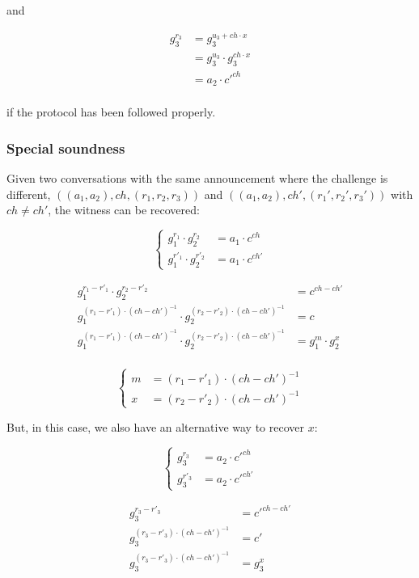 \documentclass{article}
\begin{document}
and 

\begin{align*}
  g_3^{r_3}
    &= g_3^{u_3 + ch \cdot x} \\
    &= g_3^{u_3} \cdot g_3^{ch \cdot x} \\
    &= a_2 \cdot c'^{ch} \\
\end{align*}

if the protocol has been followed properly.

\subsubsection{Special soundness}

Given two conversations with the same announcement where the
challenge is different,
$((a_1, a_2), ch, (r_1, r_2, r_3))$ and $((a_1, a_2), ch', (r_1', r_2', r_3'))$ 
with $ch \neq ch'$, the witness can be recovered:

$$
\begin{cases}
  g_1^{r_1} \cdot g_2^{r_2} &= a_1 \cdot c^{ch} \\
  g_1^{r'_1} \cdot g_2^{r'_2} &= a_1 \cdot c^{ch'}
\end{cases}
$$

\begin{align*}
  g_1^{r_1 - r'_1} \cdot g_2^{r_2 - r'_2} &= c^{ch - ch'} \\
  g_1^{(r_1 - r'_1) \cdot (ch - ch')^{-1}} \cdot g_2^{(r_2 - r'_2) \cdot (ch - ch')^{-1}} &= c \\
  g_1^{(r_1 - r'_1) \cdot (ch - ch')^{-1}} \cdot g_2^{(r_2 - r'_2) \cdot (ch - ch')^{-1}} &= g_1^m \cdot g_2^x \\
\end{align*}

$$
\begin{cases}
  m &= (r_1 - r'_1) \cdot (ch - ch')^{-1} \\
  x &= (r_2 - r'_2) \cdot (ch - ch')^{-1}
\end{cases}
$$

But, in this case, we also have an alternative way to recover $x$:

$$
\begin{cases}
  g_3^{r_3} &= a_2 \cdot c'^{ch} \\
  g_3^{r'_3} &= a_2 \cdot c'^{ch'}
\end{cases}
$$

\begin{align*}
  g_3^{r_3 - r'_3} &= c'^{ch - ch'} \\
  g_3^{(r_3 - r'_3) \cdot (ch - ch')^{-1}} &= c' \\
  g_3^{(r_3 - r'_3) \cdot (ch - ch')^{-1}} &= g_3^x \\
\end{align*}
\end{document}
